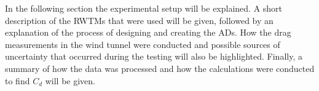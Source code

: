 
In the following section the experimental setup will be explained. A short description of the \gls{RWTM}s that were used will be given, followed by an explanation of the process of designing and creating the \gls{AD}s. How the drag measurements in the wind tunnel were conducted and possible sources of uncertainty that occurred during the testing will also be highlighted. Finally, a summary of how the data was processed and how the calculations were conducted to find $C_d$ will be given. 




